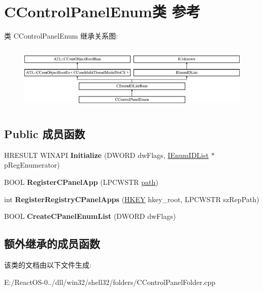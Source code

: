 \hypertarget{class_c_control_panel_enum}{}\section{C\+Control\+Panel\+Enum类 参考}
\label{class_c_control_panel_enum}
类 C\+Control\+Panel\+Enum 继承关系图\+:\begin{figure}[H]
\begin{center}
\leavevmode
\includegraphics[height=3.181818cm]{class_c_control_panel_enum}
\end{center}
\end{figure}
\subsection*{Public 成员函数}
\begin{DoxyCompactItemize}
\item 
\mbox{\label{class_c_control_panel_enum_adcecd8ca5840b08e0b07a3518564ae01}} 
H\+R\+E\+S\+U\+LT W\+I\+N\+A\+PI {\bfseries Initialize} (D\+W\+O\+RD dw\+Flags, \hyperlink{interface_i_enum_i_d_list}{I\+Enum\+I\+D\+List} $\ast$p\+Reg\+Enumerator)
\item 
\mbox{\label{class_c_control_panel_enum_a5da9bb4e437d738750888e4693bfbea2}} 
B\+O\+OL {\bfseries Register\+C\+Panel\+App} (L\+P\+C\+W\+S\+TR \hyperlink{structpath}{path})
\item 
\mbox{\label{class_c_control_panel_enum_af5e0b0e777b30e13bca923ff9e6f3a7f}} 
int {\bfseries Register\+Registry\+C\+Panel\+Apps} (\hyperlink{interfacevoid}{H\+K\+EY} hkey\+\_\+root, L\+P\+C\+W\+S\+TR sz\+Rep\+Path)
\item 
\mbox{\label{class_c_control_panel_enum_ac3671407e5b6d932cda4cadbec86957f}} 
B\+O\+OL {\bfseries Create\+C\+Panel\+Enum\+List} (D\+W\+O\+RD dw\+Flags)
\end{DoxyCompactItemize}
\subsection*{额外继承的成员函数}


该类的文档由以下文件生成\+:\begin{DoxyCompactItemize}
\item 
E\+:/\+React\+O\+S-\/0../dll/win32/shell32/folders/C\+Control\+Panel\+Folder.\+cpp\end{DoxyCompactItemize}
